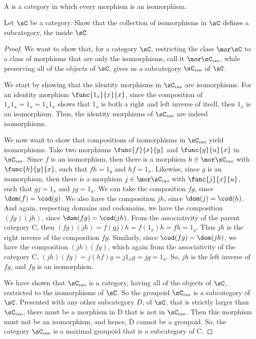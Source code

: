 \documentclass[main.tex]{subfiles}
\begin{document}
\paragraph{}
\begin{definition}
	A  is a category in which every morphism is an isomorphism.
\end{definition}
\popthm

\begin{exercise}
	Let \(\sC\) be a category. Show that the collection of isomorphisms in
	\(\sC\) defines a subcategory, the  inside \(\sC\).
\end{exercise}

\begin{proof}
	We want to show that, for a category \(\sC\), restricting the class
	\(\mor\sC\) to a class of morphisms that are only the isomorphisms, call it
	\(\mor\sC_{iso}\), while preserving all of the objects of \(\sC\), gives us
	a subcategory \(\sC_{iso}\) of \(\sC\).

	We start by showing that the identity morphisms in \(\sC_{iso}\) are
	isomorphisms. For an identity morphism \(\func{1_x}{x}{x}\), since the
	composition of \(1_x1_x=1_x=1_x1_x\) shows that \(1_x\) is both a right and
	left inverse of itself, then \(1_x\) is an isomorphism. Thus, the identity
	morphisms of \(\sC_{iso}\) are indeed isomorphisms.

	We now want to show that compositions of isomorphisms in \(\sC_{iso}\) yield
	isomorphisms. Take two morphisms \(\func{f}{x}{y}\) and \(\func{g}{u}{x}\)
	in \(\sC_{iso}\). Since \(f\) is an isomorphism, then there is a morphism
	\(h\in\mor\sC_{iso}\) with \(\func{h}{y}{x}\), such that \(fh=1_y\) and
	\(hf=1_x\). Likewise, since \(g\) is an isomorphism, then there is a
	morphism \(j\in\mor\sC_{iso}\) with \(\func{j}{x}{u}\), such that \(gj=1_x\)
	and \(jg=1_u\). We can take the composition \(fg\), since
	\(\dom(f)=\cod(g)\). We also have the composition \(jh\), since
	\(\dom(j)=\cod(h)\). And again, respecting domains and codomains, we have
	the composition \((fg)(jh)\), since \(\dom(fg)=\cod(jh)\). From the
	associativity of the parent category C, then
	\((fg)(jh)=f(gj)h=f(1_x)h=fh=1_y\). Thus \(jh\) is the right inverse of the
	composition \(fg\). Similarly, since \(\cod(fg)=\dom(jh)\), we have the
	composition \((jh)(fg)\), which again from the associativity of the category
	C, \((jh)(fg)=j(hf)g=j1_xg=jg=1_u\). So, \(jh\) is the left inverse of
	\(fg\), and \(fg\) is an isomorphism.

	We have shown that \(\sC_{iso}\) is a category, having all of the objects of
	\(\sC\), restricted to the isomorphisms of \(\sC\). So the groupoid \(\sC_{iso}\) is a
	subcategory of \(\sC\). Presented with any other subcategory \(D\), of \(\sC\), that is
	strictly larger than \(\sC_{iso}\), there must be a morphism in D that is
	not in \(\sC_{iso}\). Then this morphism must not be an isomorphism, and
	hence, D cannot be a groupoid. So, the category \(\sC_{iso}\) is a maximal
	groupoid that is a subcategory of C.
\end{proof}
\end{document}
